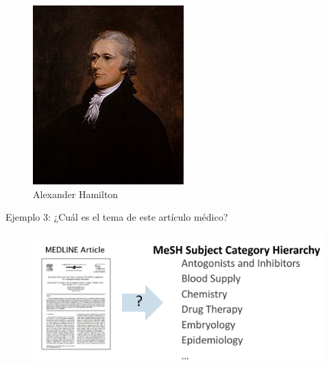 \begin{center}
\begin{figure}[h]
\begin{minipage}{0.3\textwidth}
            \includegraphics[width=\linewidth]{pics/hamilton.png}
            \caption{Alexander Hamilton}
        \end{minipage}
    \end{figure}
\end{center}


Ejemplo 3: ¿Cuál es el tema de este artículo médico?

\begin{figure}[h]
\includegraphics[scale = 0.2]{pics/medarticle.png}
\end{figure}



